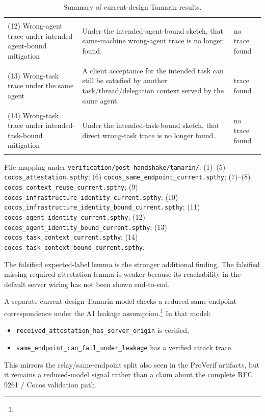 \documentclass[11pt,a4paper]{article}
\newcommand{\resulttracefound}{\colorbox{riskred}{\strut trace found}}
\newcommand{\resultnotrace}{\colorbox{statusgreen}{\strut no trace found}}
\begin{document}
\begin{table}[H]
\begin{tabularx}{\textwidth}{@{}>{\raggedright\arraybackslash}p{}>{\raggedright\arraybackslash}X>{\raggedright\arraybackslash}p{}@{}}
(12) Wrong-agent trace under intended-agent-bound mitigation & Under the intended-agent-bound sketch, that same-machine wrong-agent trace is no longer found. & \resultnotrace \\
(13) Wrong-task trace under the same agent & A client acceptance for the intended task can still be satisfied by another task/thread/delegation context served by the same agent. & \resulttracefound \\
(14) Wrong-task trace under intended-task-bound mitigation & Under the intended-task-bound sketch, that direct wrong-task trace is no longer found. & \resultnotrace \\
\bottomrule
\end{tabularx}
\caption{Summary of current-design Tamarin results.}
\label{tab:tamarin-results}
\end{table}
{\footnotesize\raggedright File mapping under
\texttt{verification/post-handshake/tamarin/}: (1)--(5)
\texttt{cocos\_attestation.spthy}; (6)
\texttt{cocos\_same\_endpoint\_current.spthy}; (7)--(8)
\texttt{cocos\_context\_reuse\_current.spthy}; (9)
\texttt{cocos\_infrastructure\_identity\_current.spthy}; (10)
\texttt{cocos\_infrastructure\_identity\_bound\_current.spthy}; (11)
\texttt{cocos\_agent\_identity\_current.spthy}; (12)
\texttt{cocos\_agent\_identity\_bound\_current.spthy}; (13)
\texttt{cocos\_task\_context\_current.spthy}; (14)
\texttt{cocos\_task\_context\_bound\_current.spthy}.\par}

The falsified expected-label lemma is the stronger additional finding. The
falsified missing-required-attestation lemma is weaker because its reachability
in the default server wiring has not been shown end-to-end.

A separate current-design Tamarin model checks a reduced same-endpoint
correspondence under the A1 leakage assumption.\footnote{}
In that model:
\begin{itemize}
\item \texttt{received\_attestation\_has\_server\_origin} is verified,
\item \texttt{same\_endpoint\_can\_fail\_under\_leakage} has a verified attack
trace.
\end{itemize}
This mirrors the relay/same-endpoint split also seen in the ProVerif artifacts,
but it remains a reduced-model signal rather than a claim about the complete
RFC 9261 / Cocos validation path.
\end{document}
